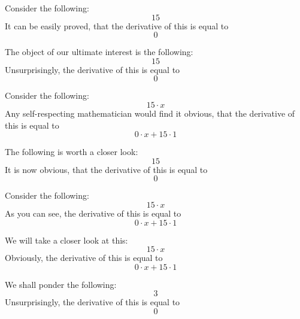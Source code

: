 \documentclass{article}
\begin{document}
Consider the following:
\begin{equation}
15 
\end{equation}
It can be easily proved, that the derivative of this is equal to
\begin{equation}
0 
\end{equation}

The object of our ultimate interest is the following:
\begin{equation}
15 
\end{equation}
Unsurprisingly, the derivative of this is equal to
\begin{equation}
0 
\end{equation}

Consider the following:
\begin{equation}
15 \cdot x 
\end{equation}
Any self-respecting mathematician would find it obvious, that the derivative of this is equal to
\begin{equation}
0 \cdot x + 15 \cdot 1 
\end{equation}

The following is worth a closer look:
\begin{equation}
15 
\end{equation}
It is now obvious, that the derivative of this is equal to
\begin{equation}
0 
\end{equation}

Consider the following:
\begin{equation}
15 \cdot x 
\end{equation}
As you can see, the derivative of this is equal to
\begin{equation}
0 \cdot x + 15 \cdot 1 
\end{equation}

We will take a closer look at this:
\begin{equation}
15 \cdot x 
\end{equation}
Obviously, the derivative of this is equal to
\begin{equation}
0 \cdot x + 15 \cdot 1 
\end{equation}

We shall ponder the following:
\begin{equation}
3 
\end{equation}
Unsurprisingly, the derivative of this is equal to
\begin{equation}
0 
\end{equation}
\end{document}
